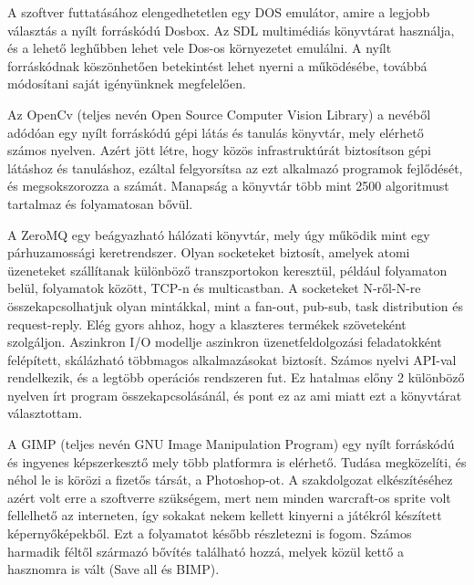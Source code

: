 

A szoftver futtatásához elengedhetetlen egy DOS emulátor, amire a legjobb választás a nyílt forráskódú Dosbox. Az SDL multimédiás könyvtárat használja, és a lehető leghűbben lehet vele Dos-os környezetet emulálni. A nyílt forráskódnak köszönhetően betekintést lehet nyerni a működésébe, továbbá módosítani saját igényünknek megfelelően. 


Az OpenCv (teljes nevén Open Source Computer Vision Library) a nevéből adódóan egy nyílt forráskódú gépi látás és tanulás könyvtár, mely elérhető számos nyelven. Azért jött létre, hogy közös infrastruktúrát biztosítson gépi látáshoz és tanuláshoz, ezáltal felgyorsítsa az ezt alkalmazó programok fejlődését, és megsokszorozza a számát. Manapság a könyvtár több mint 2500 algoritmust tartalmaz és folyamatosan bővül.


A ZeroMQ egy beágyazható hálózati könyvtár, mely úgy működik mint egy párhuzamossági keretrendszer. Olyan socketeket biztosít, amelyek atomi üzeneteket szállítanak különböző transzportokon keresztül, például folyamaton belül, folyamatok között, TCP-n és multicastban. A socketeket N-ről-N-re összekapcsolhatjuk olyan mintákkal, mint a fan-out, pub-sub, task distribution és request-reply. Elég gyors ahhoz, hogy a klaszteres termékek szöveteként szolgáljon. Aszinkron I/O modellje aszinkron üzenetfeldolgozási feladatokként felépített, skálázható többmagos alkalmazásokat biztosít. Számos nyelvi API-val rendelkezik, és a legtöbb operációs rendszeren fut. Ez hatalmas előny 2 különböző nyelven írt program összekapcsolásánál, és pont ez az ami miatt ezt a könyvtárat választottam.


A GIMP (teljes nevén GNU Image Manipulation Program) egy nyílt forráskódú és ingyenes képszerkesztő mely több platformra is elérhető. Tudása megközelíti, és néhol le is körözi a fizetős társát, a Photoshop-ot. A szakdolgozat elkészítéséhez azért volt erre a szoftverre szükségem, mert nem minden warcraft-os sprite volt fellelhető az interneten, így sokakat nekem kellett kinyerni a játékról készített képernyőképekből. Ezt a folyamatot később részletezni is fogom. Számos harmadik féltől származó bővítés található hozzá, melyek közül kettő a hasznomra is vált (Save all és BIMP).


